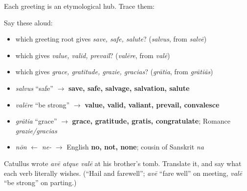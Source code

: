 \begin{cousinweb}
Each greeting is an etymological hub. Trace them:

Say these aloud:

\begin{itemize}
\raggedright
  \item which greeting root gives \emph{save, safe, salute}? (\emph{salvus}, from \emph{salvē})
  \item which gives \emph{value, valid, prevail}? (\emph{valēre}, from \emph{valē})
  \item which gives \emph{grace, gratitude, grazie, gracias}? (\emph{grātia}, from \emph{grātiās})
\end{itemize}
\end{cousinweb}

\begin{tcolorbox}[breakable,colback=teal!4,colframe=teal!35!black,title={Before you move on}]
\begin{itemize}
\raggedright
  \item \emph{salvus} \textquotedblleft{}safe\textquotedblright{} $\to$ \textbf{save, safe, salvage, salvation, salute}
  \item \emph{valēre} \textquotedblleft{}be strong\textquotedblright{} $\to$ \textbf{value, valid, valiant, prevail, convalesce}
  \item \emph{grātia} \textquotedblleft{}grace\textquotedblright{} $\to$ \textbf{grace, gratitude, gratis, congratulate}; Romance \emph{grazie/gracias}
  \item \emph{nōn} $\leftarrow$ \emph{ne-} $\to$ English \textbf{no, not, none}; cousin of Sanskrit \emph{na}
\end{itemize}
\end{tcolorbox}

\begin{tcolorbox}[breakable,colback=teal!4,colframe=teal!35!black,title={Before you move on}]
Catullus wrote \emph{avē atque valē} at his brother's tomb. Translate it, and say what each verb literally wishes. (\textquotedblleft{}Hail and farewell\textquotedblright{}; \emph{avē} \textquotedblleft{}fare well\textquotedblright{} on meeting, \emph{valē} \textquotedblleft{}be strong\textquotedblright{} on parting.)
\end{tcolorbox}
